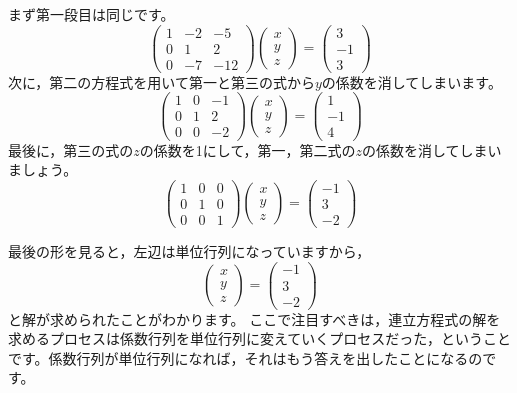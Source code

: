 \documentclass{ltjsbook}
\begin{document}
まず第一段目は同じです。
\[
	\begin{pmatrix} 1 & -2 & -5  \\
                0 & 1  & 2   \\
                0 & -7 & -12\end{pmatrix}
	\begin{pmatrix} x \\ y \\ z \end{pmatrix}
	=
	\begin{pmatrix} 3 \\ -1 \\ 3 \end{pmatrix}
\]
次に，第二の方程式を用いて第一と第三の式から$y$の係数を消してしまいます。
\[
	\begin{pmatrix} 1 & 0 & -1 \\
                0 & 1 & 2  \\
                0 & 0 & -2\end{pmatrix}
	\begin{pmatrix} x \\ y \\ z \end{pmatrix}
	=
	\begin{pmatrix} 1 \\ -1 \\ 4 \end{pmatrix}
\]
最後に，第三の式の$z$の係数を1にして，第一，第二式の$z$の係数を消してしまいましょう。
\[
	\begin{pmatrix} 1 & 0 & 0 \\
                0 & 1 & 0 \\
                0 & 0 & 1\end{pmatrix}
	\begin{pmatrix} x \\ y \\ z \end{pmatrix}
	=
	\begin{pmatrix} -1 \\ 3 \\ -2 \end{pmatrix}
\]

最後の形を見ると，左辺は単位行列になっていますから，
\[
	\begin{pmatrix}
		x \\
		y \\
		z
	\end{pmatrix}
	=
	\begin{pmatrix}
		-1 \\
		3  \\
		-2
	\end{pmatrix}
\]
と解が求められたことがわかります。
ここで注目すべきは，連立方程式の解を求めるプロセスは係数行列を単位行列に変えていくプロセスだった，ということです。係数行列が単位行列になれば，それはもう答えを出したことになるのです。
\end{document}
